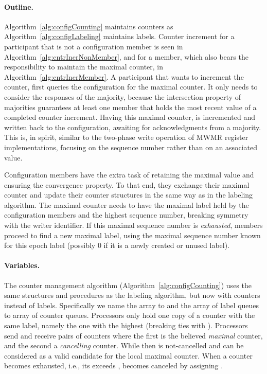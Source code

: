 \documentclass[11pt]{article}
\begin{document}
\paragraph{Outline.} 
Algorithm~\ref{alg:configCounting} maintains counters as Algorithm~\ref{alg:configLabeling} maintains labels. 
Counter increment for a participant that is not a configuration member is seen in Algorithm~\ref{alg:cntrIncrNonMember}, and for a member, which also bears the responsibility to maintain the maximal counter, in Algorithm~\ref{alg:cntrIncrMember}. A participant that wants to increment the counter, first queries the configuration for the maximal counter.
It only needs to consider the responses of the majority, because the intersection property of majorities guarantees at least one member that holds the most recent value of a completed counter increment.
Having this maximal counter,  is incremented and written back to the configuration, awaiting for acknowledgments from a majority.
This is, in spirit, similar to the two-phase write operation of MWMR register implementations, focusing on the sequence number rather than on an associated value. 

Configuration members have the extra task of retaining the maximal value and ensuring the convergence property.
To that end, they exchange their maximal counter and update their counter structures in the same way as in the labeling algorithm. 
The maximal counter needs to have the maximal label held by the configuration members and the highest sequence number, breaking symmetry with the writer identifier. 
If this maximal sequence number is {\em exhausted}, members proceed to find a new maximal label, using the maximal sequence number known for this epoch label (possibly 0 if it is a newly created or unused label). 

\paragraph{Variables.} The counter management algorithm (Algorithm~\ref{alg:configCounting}) uses the same structures and procedures as the labeling algorithm, but now with counters instead of labels. 
Specifically we name the  array to  and the  array of label queues to  array of counter queues.
Processors only hold one copy of a counter with the same label, namely the one with the highest  (breaking ties with ). 
Processors send and receive pairs of counters  where the first is the believed \emph{maximal} counter, and the second a \emph{cancelling} counter.
While  then  is not-cancelled and can be considered as a valid candidate for the local maximal counter.
When a counter becomes exhausted, i.e., its  exceeds ,  becomes canceled by assigning .
\end{document}
